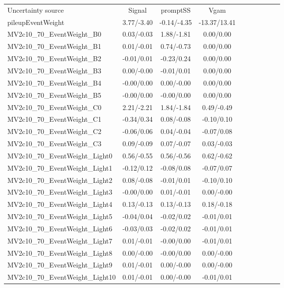 \begin{table}[h]
\scriptsize
\begin{center}
\begin{tabular}{l|ccccccccc}
\hline
\hline
Uncertainty source &Signal &promptSS &Vgam \\
pileupEventWeight &3.77/-3.40 &-0.14/-4.35 &-13.37/13.41 \\
MV2c10\_70\_EventWeight\_B0 &0.03/-0.03 &1.88/-1.81 &0.00/0.00 \\
MV2c10\_70\_EventWeight\_B1 &0.01/-0.01 &0.74/-0.73 &0.00/0.00 \\
MV2c10\_70\_EventWeight\_B2 &-0.01/0.01 &-0.23/0.24 &0.00/0.00 \\
MV2c10\_70\_EventWeight\_B3 &0.00/-0.00 &-0.01/0.01 &0.00/0.00 \\
MV2c10\_70\_EventWeight\_B4 &-0.00/0.00 &0.00/-0.00 &0.00/0.00 \\
MV2c10\_70\_EventWeight\_B5 &-0.00/0.00 &-0.00/0.00 &0.00/0.00 \\
MV2c10\_70\_EventWeight\_C0 &2.21/-2.21 &1.84/-1.84 &0.49/-0.49 \\
MV2c10\_70\_EventWeight\_C1 &-0.34/0.34 &0.08/-0.08 &-0.10/0.10 \\
MV2c10\_70\_EventWeight\_C2 &-0.06/0.06 &0.04/-0.04 &-0.07/0.08 \\
MV2c10\_70\_EventWeight\_C3 &0.09/-0.09 &0.07/-0.07 &0.03/-0.03 \\
MV2c10\_70\_EventWeight\_Light0 &0.56/-0.55 &0.56/-0.56 &0.62/-0.62 \\
MV2c10\_70\_EventWeight\_Light1 &-0.12/0.12 &-0.08/0.08 &-0.07/0.07 \\
MV2c10\_70\_EventWeight\_Light2 &0.08/-0.08 &-0.01/0.01 &-0.10/0.10 \\
MV2c10\_70\_EventWeight\_Light3 &-0.00/0.00 &0.01/-0.01 &0.00/-0.00 \\
MV2c10\_70\_EventWeight\_Light4 &0.13/-0.13 &0.13/-0.13 &0.18/-0.18 \\
MV2c10\_70\_EventWeight\_Light5 &-0.04/0.04 &-0.02/0.02 &-0.01/0.01 \\
MV2c10\_70\_EventWeight\_Light6 &-0.03/0.03 &-0.02/0.02 &-0.01/0.01 \\
MV2c10\_70\_EventWeight\_Light7 &0.01/-0.01 &-0.00/0.00 &-0.01/0.01 \\
MV2c10\_70\_EventWeight\_Light8 &0.00/-0.00 &-0.00/0.00 &0.00/-0.00 \\
MV2c10\_70\_EventWeight\_Light9 &0.01/-0.01 &0.00/-0.00 &0.00/-0.00 \\
MV2c10\_70\_EventWeight\_Light10 &0.01/-0.01 &0.00/-0.00 &-0.01/0.01 \\

\end{tabular}
\end{center}
\end{table}
